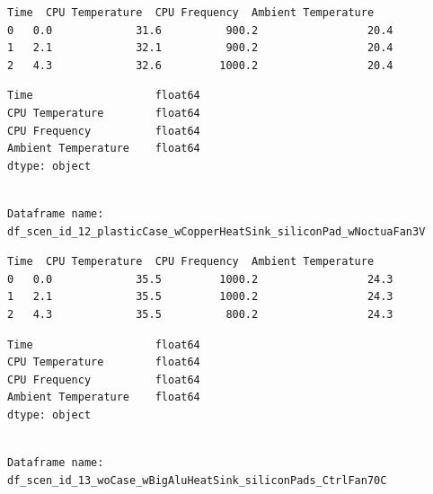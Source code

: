 \documentclass[10pt,parskip=half,
toc=sectionentrywithdots,
bibliography=totocnumbered,
captions=tableheading,numbers=noendperiod]{scrartcl}
\begin{document}
\begin{lstlisting}[language={},postbreak={},numbers=none,xrightmargin=7pt,breakindent=0pt,aboveskip=5pt,belowskip=5pt]
   Time  CPU Temperature  CPU Frequency  Ambient Temperature
0   0.0             31.6          900.2                 20.4
1   2.1             32.1          900.2                 20.4
2   4.3             32.6         1000.2                 20.4
\end{lstlisting}

\begin{lstlisting}[language={},postbreak={},numbers=none,xrightmargin=7pt,breakindent=0pt,aboveskip=5pt,belowskip=5pt]
Time                   float64
CPU Temperature        float64
CPU Frequency          float64
Ambient Temperature    float64
dtype: object
\end{lstlisting}

\begin{lstlisting}[language={},postbreak={},numbers=none,xrightmargin=7pt,belowskip=5pt,aboveskip=5pt,breakindent=0pt]

Dataframe name: df_scen_id_12_plasticCase_wCopperHeatSink_siliconPad_wNoctuaFan3V

\end{lstlisting}

\begin{lstlisting}[language={},postbreak={},numbers=none,xrightmargin=7pt,breakindent=0pt,aboveskip=5pt,belowskip=5pt]
   Time  CPU Temperature  CPU Frequency  Ambient Temperature
0   0.0             35.5         1000.2                 24.3
1   2.1             35.5         1000.2                 24.3
2   4.3             35.5          800.2                 24.3
\end{lstlisting}

\begin{lstlisting}[language={},postbreak={},numbers=none,xrightmargin=7pt,breakindent=0pt,aboveskip=5pt,belowskip=5pt]
Time                   float64
CPU Temperature        float64
CPU Frequency          float64
Ambient Temperature    float64
dtype: object
\end{lstlisting}

\begin{lstlisting}[language={},postbreak={},numbers=none,xrightmargin=7pt,belowskip=5pt,aboveskip=5pt,breakindent=0pt]

Dataframe name: df_scen_id_13_woCase_wBigAluHeatSink_siliconPads_CtrlFan70C

\end{lstlisting}
\end{document}
